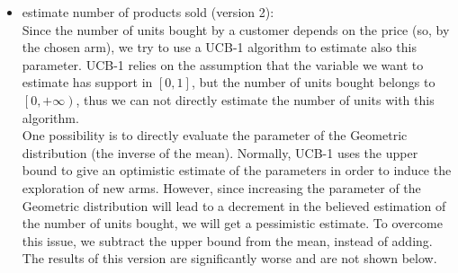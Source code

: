 \begin{itemize}
\begin{itemize}
    \end{itemize}
    \item estimate number of products sold (version 2):\\
    Since the number of units bought by a customer depends on the price (so, by the chosen arm), we try to use a UCB-1 algorithm to estimate also this parameter. UCB-1 relies on the assumption that the variable we want to estimate has support in $\left[0, 1 \right]$, but the number of units bought belongs to $\left[0, +\infty \right)$, thus we can not directly estimate the number of units with this algorithm.\\
    One possibility is to directly evaluate the parameter of the Geometric distribution (the inverse of the mean). Normally, UCB-1 uses the upper bound to give an optimistic estimate of the parameters in order to induce the exploration of new arms. However, since increasing the parameter of the Geometric distribution will lead to a decrement in the believed estimation of the number of units bought, we will get a pessimistic estimate. To overcome this issue, we subtract the upper bound from the mean, instead of adding.\\
 The results of this version are significantly worse and are not shown below.
\end{itemize}
